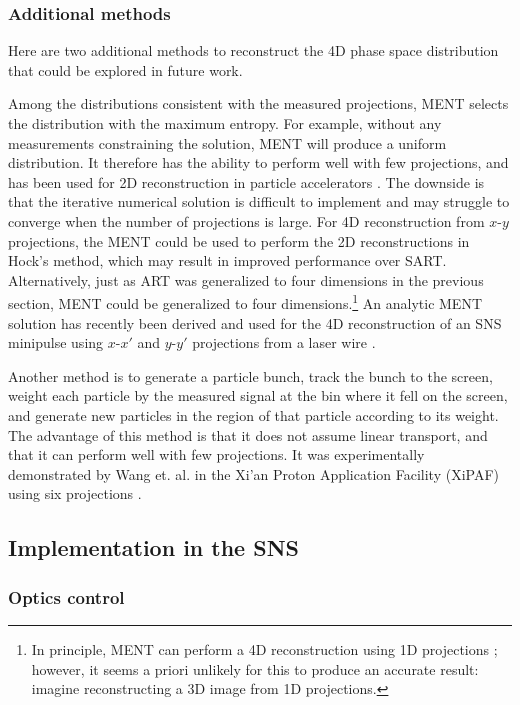 \subsubsection{Additional methods}

Here are two additional methods to reconstruct the 4D phase space distribution that could be explored in future work.

Among the distributions consistent with the measured projections, MENT selects the distribution with the maximum entropy. For example, without any measurements constraining the solution, MENT will produce a uniform distribution. It therefore has the ability to perform well with few projections, and has been used for 2D reconstruction in particle accelerators \cite{Hock2013a}. The downside is that the iterative numerical solution is difficult to implement and may struggle to converge when the number of projections is large. For 4D reconstruction from $x$-$y$ projections, the MENT could be used to perform the 2D reconstructions in Hock's method, which may result in improved performance over SART. Alternatively, just as ART was generalized to four dimensions in the previous section, MENT could be generalized to four dimensions.\footnote{In principle, MENT can perform a 4D reconstruction using 1D projections \cite{Sander1979}; however, it seems a priori unlikely for this to produce an accurate result: imagine reconstructing a 3D image from 1D projections.} An analytic MENT solution has recently been derived and used for the 4D reconstruction of an SNS minipulse using $x$-$x'$ and $y$-$y'$ projections from a laser wire \cite{Wong-forthcoming}. 

Another method is to generate a particle bunch, track the bunch to the screen, weight each particle by the measured signal at the bin where it fell on the screen, and generate new particles in the region of that particle according to its weight. The advantage of this method is that it does not assume linear transport, and that it can perform well with few projections. It was experimentally demonstrated by Wang et. al. in the Xi’an Proton Application Facility (XiPAF) using six projections \cite{Wang2019}. 



\subsection{Implementation in the SNS}

\subsubsection{Optics control}

